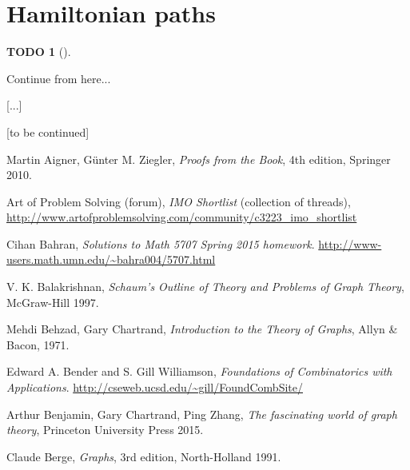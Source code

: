 \documentclass[numbers=enddot,12pt,final,onecolumn,notitlepage]{scrartcl}%
\theoremstyle{definition}
\newtheorem{quest}[theo]{TODO}
\newenvironment{todo}[1][]
{\begin{quest}[#1]\begin{leftbar}}
{\end{leftbar}\end{quest}}
\begin{document}
\section{\label{sect.hamilton}Hamiltonian paths}

\begin{todo}
Continue from here...
\end{todo}

[...]

[to be continued]

\begin{thebibliography}{9999999999}                                                                                       %

Martin Aigner, G\"{u}nter M. Ziegler,
\textit{Proofs from the Book}, 4th edition, Springer 2010.

Art of Problem Solving (forum),
\textit{IMO Shortlist} (collection of threads),
\newline
\url{http://www.artofproblemsolving.com/community/c3223_imo_shortlist}


Cihan Bahran,
\textit{Solutions to Math 5707 Spring 2015 homework}.
\newline \url{http://www-users.math.umn.edu/~bahra004/5707.html}

V. K. Balakrishnan,
\textit{Schaum's Outline of Theory and Problems of Graph Theory},
McGraw-Hill 1997.


Mehdi Behzad, Gary Chartrand,
\textit{Introduction to the Theory of Graphs},
Allyn \& Bacon, 1971.

Edward A. Bender and S. Gill Williamson,
\textit{Foundations of Combinatorics with Applications}.
\newline \url{http://cseweb.ucsd.edu/~gill/FoundCombSite/}

Arthur Benjamin, Gary Chartrand,
Ping Zhang,
\textit{The fascinating world of graph theory},
Princeton University Press 2015.

Claude Berge,
\textit{Graphs}, 3rd edition, North-Holland 1991.


\end{thebibliography}
\end{document}
